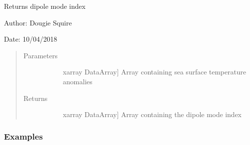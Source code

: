 \documentclass[letterpaper,10pt,english]{sphinxmanual}
\begin{document}

\begin{fulllineitems}
\label{\detokenize{diagnostic_doc:diagnostic.dmi}}
Returns dipole mode index

\begin{DUlineblock}{0em}
\item[] Author: Dougie Squire
\item[] Date: 10/04/2018
\end{DUlineblock}
\begin{quote}\begin{description}
\item[{Parameters}] \leavevmode\begin{description}
\item[{}] \leavevmode{[}xarray DataArray{]}
Array containing sea surface temperature anomalies

\end{description}

\item[{Returns}] \leavevmode\begin{description}
\item[{}] \leavevmode{[}xarray DataArray{]}
Array containing the dipole mode index

\end{description}

\end{description}\end{quote}
\subsubsection*{Examples}


\end{fulllineitems}
\end{document}
